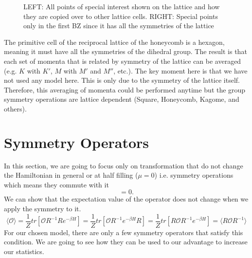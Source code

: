\begin{figure}
\begin{center}
  \caption{LEFT: All points of special interest shown on the lattice and how they are copied over to other lattice cells. RIGHT: Special points only in the first BZ since it has all the symmetries of the lattice}
  \label{fig:points}
\end{center}
\end{figure}
The primitive cell of the reciprocal lattice of the honeycomb is a hexagon, meaning it must have all the symmetries of the dihedral group. The result is that each set of momenta that is related by symmetry of the lattice can be averaged (e.g. $K$ with $K'$, $M$ with $M'$ and $M''$, etc.). The key moment here is that we have not used any model here. This is only due to the symmetry of the lattice itself. Therefore, this averaging of momenta could be performed anytime but the group symmetry operations are lattice dependent (Square, Honeycomb, Kagome, and others).

\section{Symmetry Operators}
\label{sec:sym-oper}
In this section, we are going to focus only on transformation that do not change the Hamiltonian in general or at half filling ($\mu=0$) i.e. symmetry operations which means they commute with it 
\begin{equation}
  [H,R] = 0.
\end{equation}
We can show that the expectation value of the operator does not change when we apply the symmetry to it.
\begin{equation}
 \langle \mathcal{O} \rangle = \frac{1}{Z} tr[\mathcal{O}R^{-1}Re^{-\beta H}] = \frac{1}{Z} tr[\mathcal{O}R^{-1}e^{-\beta H}R] = \frac{1}{Z} tr[R\mathcal{O}R^{-1}e^{-\beta H}] = \langle R\mathcal{O}R^{-1} \rangle
\end{equation}
For our chosen model, there are only a few symmetry operators that satisfy this condition. We are going to see how they can be used to our advantage to increase our statistics.

